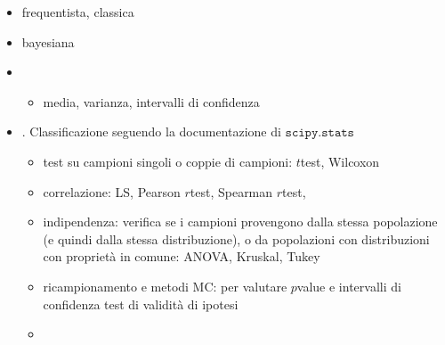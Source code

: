 \documentclass[letterpaper,10pt,italian]{jupyterBook}
\begin{document}
\sphinxAtStartPar
{}
\begin{itemize}
\item {} 
\sphinxAtStartPar
frequentista, classica

\item {} 
\sphinxAtStartPar
bayesiana

\end{itemize}

\sphinxAtStartPar
{}
\begin{itemize}
\item {} 
\sphinxAtStartPar
{}
\begin{itemize}
\item {} 
\sphinxAtStartPar
media, varianza, intervalli di confidenza

\end{itemize}

\item {} 
\sphinxAtStartPar
{}. Classificazione seguendo la documentazione di \(\texttt{scipy.stats}\)
\begin{itemize}
\item {} 
\sphinxAtStartPar
test su campioni singoli o coppie di campioni: \(t\)\sphinxhyphen{}test, Wilcoxon

\item {} 
\sphinxAtStartPar
correlazione: LS, Pearson \(r\)\sphinxhyphen{}test, Spearman \(r\)\sphinxhyphen{}test,

\item {} 
\sphinxAtStartPar
indipendenza: verifica se i campioni provengono dalla stessa popolazione (e quindi dalla stessa distribuzione), o da popolazioni con distribuzioni con proprietà in comune: ANOVA, Kruskal, Tukey

\item {} 
\sphinxAtStartPar
ri\sphinxhyphen{}campionamento e metodi MC: per valutare \(p\)\sphinxhyphen{}value e intervalli di confidenza test di validità di ipotesi

\item {} 
\sphinxAtStartPar
{}

\end{itemize}

\end{itemize}

\sphinxAtStartPar
{}
\end{document}
